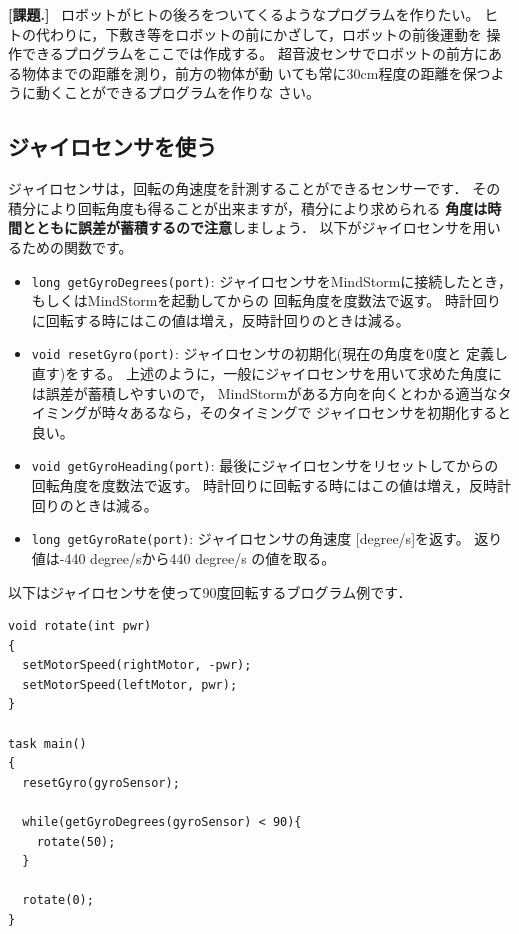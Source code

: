 \documentclass[11pt]{jsarticle}
\makeatletter
\newcounter{wnum}[section]
\def\thewnum{課題\thesection.\the\c@wnum}
\def\work{\refstepcounter{wnum}%
  \vspace{3mm}\noindent\textbf{[\thewnum]}~}
\makeatother
\begin{document}
\work
ロボットがヒトの後ろをついてくるようなプログラムを作りたい。
ヒトの代わりに，下敷き等をロボットの前にかざして，ロボットの前後運動を
操作できるプログラムをここでは作成する。
超音波センサでロボットの前方にある物体までの距離を測り，前方の物体が動
いても常に30cm程度の距離を保つように動くことができるプログラムを作りな
さい。

\subsection{ジャイロセンサを使う}

ジャイロセンサは，回転の角速度を計測することができるセンサーです．
その積分により回転角度も得ることが出来ますが，積分により求められる
\textbf{角度は時間とともに誤差が蓄積するので注意}しましょう．
以下がジャイロセンサを用いるための関数です。
\begin{itemize}
\item
{}
\verb|long getGyroDegrees(port)|: 
ジャイロセンサをMindStormに接続したとき，もしくはMindStormを起動してからの
回転角度を度数法で返す。
時計回りに回転する時にはこの値は増え，反時計回りのときは減る。
\item 
{}
\verb|void resetGyro(port)|: ジャイロセンサの初期化(現在の角度を0度と
定義し直す)をする。
上述のように，一般にジャイロセンサを用いて求めた角度には誤差が蓄積しやすいので，
MindStormがある方向を向くとわかる適当なタイミングが時々あるなら，そのタイミングで
ジャイロセンサを初期化すると良い。
\item 
{}
\verb|void getGyroHeading(port)|: 
最後にジャイロセンサをリセットしてからの回転角度を度数法で返す。
時計回りに回転する時にはこの値は増え，反時計回りのときは減る。
\item
{}
\verb|long getGyroRate(port)|: ジャイロセンサの角速度 [degree/s]を返す。
返り値は-440 degree/sから440 degree/s の値を取る。
\end{itemize}

以下はジャイロセンサを使って90度回転するブログラム例です．

\begin{lstlisting}
void rotate(int pwr)
{
  setMotorSpeed(rightMotor, -pwr);
  setMotorSpeed(leftMotor, pwr);
}

task main()
{
  resetGyro(gyroSensor);

  while(getGyroDegrees(gyroSensor) < 90){
    rotate(50);
  }

  rotate(0);
}
\end{lstlisting}
\end{document}
